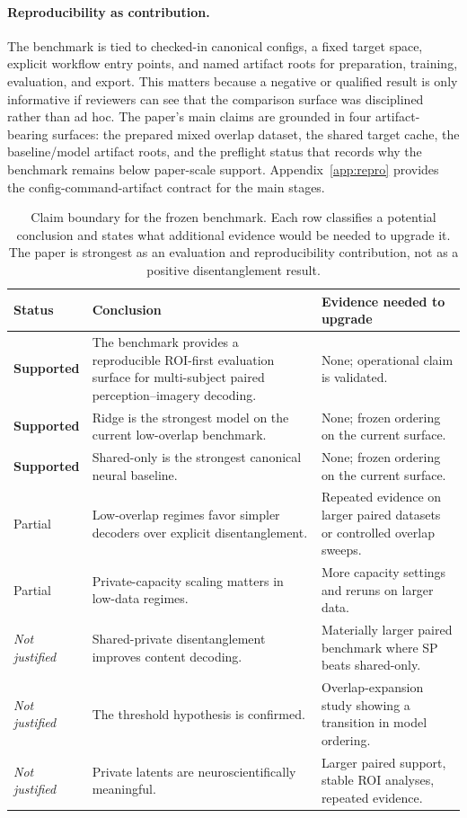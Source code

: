 \documentclass{article}
\begin{document}
\paragraph{Reproducibility as contribution.}
The benchmark is tied to checked-in canonical configs, a fixed target space,
explicit workflow entry points, and named artifact roots for preparation,
training, evaluation, and export.  This matters because a negative or qualified
result is only informative if reviewers can see that the comparison surface was
disciplined rather than ad hoc.  The paper's main claims are grounded in four
artifact-bearing surfaces: the prepared mixed overlap dataset, the shared target
cache, the baseline/model artifact roots, and the preflight status that records
why the benchmark remains below paper-scale support.  Appendix~\ref{app:repro}
provides the config-command-artifact contract for the main stages.

\begin{table}[t]
  \centering
  \footnotesize
  \caption{Claim boundary for the frozen benchmark.  Each row classifies a
  potential conclusion and states what additional evidence would be needed
  to upgrade it.  The paper is strongest as an evaluation and reproducibility
  contribution, not as a positive disentanglement result.}
  \label{tab:claims}
  \begin{tabularx}{\linewidth}{@{}L{1.45cm}YY@{}}
    \toprule
    Status & Conclusion & Evidence needed to upgrade \\
    \midrule
    \textbf{Supported}
      & The benchmark provides a reproducible ROI-first evaluation surface for
        multi-subject paired perception--imagery decoding.
      & None; operational claim is validated. \\[3pt]
    \textbf{Supported}
      & Ridge is the strongest model on the current low-overlap benchmark.
      & None; frozen ordering on the current surface. \\[3pt]
    \textbf{Supported}
      & Shared-only is the strongest canonical neural baseline.
      & None; frozen ordering on the current surface. \\[3pt]
    Partial
      & Low-overlap regimes favor simpler decoders over explicit
        disentanglement.
      & Repeated evidence on larger paired datasets or controlled overlap
        sweeps. \\[3pt]
    Partial
      & Private-capacity scaling matters in low-data regimes.
      & More capacity settings and reruns on larger data. \\[3pt]
    \textit{Not justified}
      & Shared-private disentanglement improves content decoding.
      & Materially larger paired benchmark where SP beats shared-only. \\[3pt]
    \textit{Not justified}
      & The threshold hypothesis is confirmed.
      & Overlap-expansion study showing a transition in model ordering. \\[3pt]
    \textit{Not justified}
      & Private latents are neuroscientifically meaningful.
      & Larger paired support, stable ROI analyses, repeated evidence. \\
    \bottomrule
  \end{tabularx}
\end{table}
\end{document}
